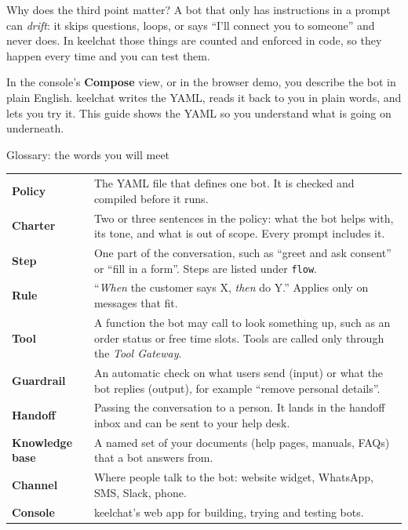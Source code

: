 \documentclass[11pt,a4paper]{article}
\newcommand{\codeus}{\textunderscore\allowbreak}
\newcommand{\key}[1]{{\renewcommand{\_}{\codeus}\texttt{\color{ckey}#1}}}
\begin{document}
Why does the third point matter? A bot that only has instructions in a prompt can \emph{drift}: it skips
questions, loops, or says ``I'll connect you to someone'' and never does. In keelchat those things are counted
and enforced in code, so they happen every time and you can test them.

\begin{tip}
In the console's \textbf{Compose} view, or in the browser demo, you describe the bot in plain English.
keelchat writes the YAML, reads it back to you in plain words, and lets you try it. This guide shows the YAML
so you understand what is going on underneath.
\end{tip}

\begin{panel}{Glossary: the words you will meet}
\small
\begin{tabularx}{\linewidth}{@{}L{2.9cm}Y@{}}
\textbf{Policy} & The YAML file that defines one bot. It is checked and compiled before it runs. \\
\textbf{Charter} & Two or three sentences in the policy: what the bot helps with, its tone, and what is out
  of scope. Every prompt includes it. \\
\textbf{Step} & One part of the conversation, such as ``greet and ask consent'' or ``fill in a form''. Steps
  are listed under \key{flow}. \\
\textbf{Rule} & ``\emph{When} the customer says X, \emph{then} do Y.'' Applies only on messages that fit. \\
\textbf{Tool} & A function the bot may call to look something up, such as an order status or free time slots.
  Tools are called only through the \emph{Tool Gateway}. \\
\textbf{Guardrail} & An automatic check on what users send (input) or what the bot replies (output), for
  example ``remove personal details''. \\
\textbf{Handoff} & Passing the conversation to a person. It lands in the handoff inbox and can be sent to your
  help desk. \\
\textbf{Knowledge base} & A named set of your documents (help pages, manuals, FAQs) that a bot answers from. \\
\textbf{Channel} & Where people talk to the bot: website widget, WhatsApp, SMS, Slack, phone. \\
\textbf{Console} & keelchat's web app for building, trying and testing bots. \\
\end{tabularx}
\end{panel}
\end{document}
